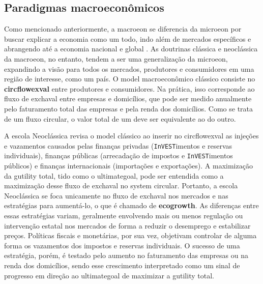 \documentclass[./main.tex]{subfiles}
\begin{document}
\subsection{Paradigmas macroeconômicos} \label{subsec:macroeco}

\par Como mencionado anteriormente, a \gls{macroeon} se diferencia da \gls{microeon} por buscar explicar a economia como um todo, indo além de mercados específicos e abrangendo até a economia nacional e global \cite{samuelson2009}. As doutrinas clássica e neoclássica da \gls{macroeon}, no entanto, tendem a ser uma generalização da \gls{microeon}, expandindo a visão para todos os mercados, produtores e consumidores em uma região de interesse, como um país. O \gls{model} macroeconômico clássico consiste no \textbf{\gls{circflowexval}} entre produtores e consumidores. Na prática, isso corresponde ao fluxo de \gls{exchaval} entre empresas e domicílios, que pode ser medido anualmente pelo faturamento total das empresas e pela renda dos domicílios. Como se trata de um fluxo circular, o valor total de um deve ser equivalente ao do outro. 

\par A escola Neoclássica revisa o \gls{model} clássico ao inserir no \gls{circflowexval} as injeções e vazamentos causados pelas finanças privadas (\texttt{InVEST}imentos e reservas individuais), finanças públicas (arrecadação de impostos e \texttt{InVEST}imentos públicos) e finanças internacionais (importações e exportações). A maximização da \gls{gutility} total, tido como o \gls{ultimategoal}, pode ser entendida como a maximização desse fluxo de \gls{exchaval} no \gls{system} circular. Portanto, a escola Neoclássica se foca unicamente no fluxo de \gls{exchaval} nos mercados e nas estratégias para aumentá-lo, o que é chamado de \textbf{\gls{ecogrowth}}. As diferenças entre essas estratégias variam, geralmente envolvendo mais ou menos regulação ou intervenção estatal nos mercados de forma a reduzir o desemprego e estabilizar preços. Políticas fiscais e monetárias, por sua vez, objetivam controlar de alguma forma os vazamentos dos impostos e reservas individuais. O sucesso de uma estratégia, porém, é testado pelo aumento no faturamento das empresas ou na renda dos domicílios, sendo esse crescimento interpretado como um sinal de progresso em direção ao \gls{ultimategoal} de maximizar a \gls{gutility} total.
\end{document}
